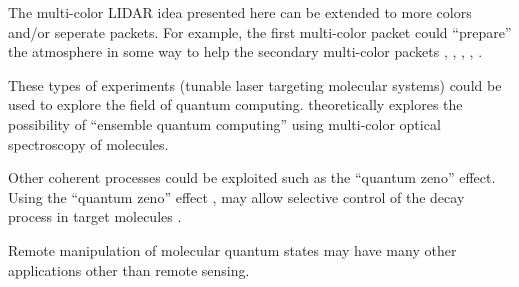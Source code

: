 The multi-color LIDAR idea presented here can be extended to more colors and/or seperate packets. For example, the first multi-color packet could ``prepare'' the atmosphere in some way to help the secondary multi-color packets \cite{Mccall:1969a}, \cite{Eberly:1998a}, \cite{Scully:2001a}, \cite{Oreg:1984a}, \cite{Grobe:1994a}.

These types of experiments (tunable laser targeting molecular systems) could be used to explore the field of quantum computing. \cite{Goswami:2002a} theoretically explores the possibility of ``ensemble quantum computing'' using multi-color optical spectroscopy of molecules. 

Other coherent processes could be exploited such as the ``quantum zeno'' effect. Using the ``quantum zeno'' effect \cite{Home:1997}, \cite{Spreeuw:1997a} may allow selective control of the decay process in target molecules \cite{Itano:1990a}.

Remote manipulation of molecular quantum states may have many other applications other than remote sensing.
